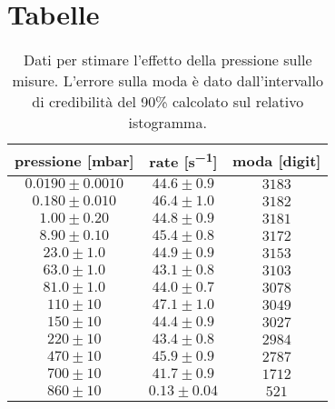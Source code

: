 
\section{Tabelle}

\begin{table}[h]
\centering
\begin{tabular}{c|c|c}

pressione [mbar] & rate [\si{s^{-1}}] & moda [digit] \\
\hline
$ 0.0190 \pm 0.0010 $ & $ 44.6 \pm 0.9 $ & $ 3183 $ \\ 
$ 0.180 \pm 0.010 $ & $ 46.4 \pm 1.0 $ & $ 3182 $ \\ 
$ 1.00 \pm 0.20 $ & $ 44.8 \pm 0.9 $ & $ 3181 $ \\ 
$ 8.90 \pm 0.10 $ & $ 45.4 \pm 0.8 $ & $ 3172 $ \\ 
$ 23.0 \pm 1.0 $ & $ 44.9 \pm 0.9 $ & $ 3153 $ \\ 
$ 63.0 \pm 1.0 $ & $ 43.1 \pm 0.8 $ & $ 3103 $ \\ 
$ 81.0 \pm 1.0 $ & $ 44.0 \pm 0.7 $ & $ 3078 $ \\ 
$ 110 \pm 10 $ & $ 47.1 \pm 1.0 $ & $ 3049 $ \\ 
$ 150 \pm 10 $ & $ 44.4 \pm 0.9 $ & $ 3027 $ \\ 
$ 220 \pm 10 $ & $ 43.4 \pm 0.8 $ & $ 2984 $ \\ 
$ 470 \pm 10 $ & $ 45.9 \pm 0.9 $ & $ 2787 $ \\ 
$ 700 \pm 10 $ & $ 41.7 \pm 0.9 $ & $ 1712 $ \\ 
$ 860 \pm 10 $ & $ 0.13 \pm 0.04 $ & $ 521 $ \\ 

\end{tabular}
\caption{Dati per stimare l'effetto della pressione sulle misure. L'errore sulla moda è dato dall'intervallo di credibilità del 90\% calcolato sul relativo istogramma.}
\label{tab:press}
\end{table}


